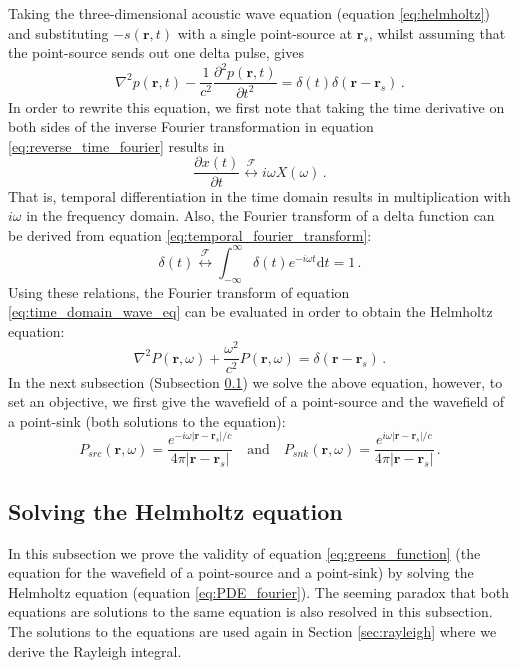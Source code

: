 Taking the three-dimensional acoustic wave equation (equation \ref{eq:helmholtz}) and substituting $-s(\mathbf r, t)$ with a single point-source at $\mathbf r_s$, whilst assuming that the point-source sends out one delta pulse, gives
\begin{equation}
    \nabla^2 p (\mathbf r, t) - \frac{1}{c^2} \frac{\partial^2 p (\mathbf r, t)}{\partial t^2} = \delta(t) \delta(\mathbf r-\mathbf r_s) \,.\label{eq:time_domain_wave_eq}
\end{equation}
In order to rewrite this equation, we first note that taking the time derivative on both sides of the inverse Fourier transformation in equation \ref{eq:reverse_time_fourier} results in
\begin{equation}
    \frac{\partial x(t)}{\partial t} \stackrel{\mathcal F}{\longleftrightarrow} i \omega X(\omega) \,. \nonumber
\end{equation}
That is, temporal differentiation in the time domain results in multiplication with $i\omega$ in the frequency domain.
Also, the Fourier transform of a delta function can be derived from equation \ref{eq:temporal_fourier_transform}:
\begin{equation}
    \delta(t) \stackrel{\mathcal F}{\longleftrightarrow} \int_{-\infty}^{\infty} \delta(t) e^{-i\omega t} \mathrm d t = 1 \,. \nonumber
\end{equation}
Using these relations, the Fourier transform of equation \ref{eq:time_domain_wave_eq} can be evaluated in order to obtain the Helmholtz equation:
\begin{equation}
    \nabla^2 P (\mathbf r, \omega) + \frac{\omega^2}{c^2} P (\mathbf r, \omega) = \delta(\mathbf r - \mathbf r_s) \,.\label{eq:PDE_fourier}
\end{equation}
In the next subsection (Subsection \ref{solving_helmholtz}) we solve the above equation, however, to set an objective, we first give the wavefield of a point-source and the wavefield of a point-sink (both solutions to the equation):
\begin{equation}
    P_{src} (\mathbf r, \omega) = \frac{e^{-i \omega |\mathbf r - \mathbf r_s| / c}}{4 \pi |\mathbf r-\mathbf r_s|} \quad \textrm{and} \quad
    P_{snk} (\mathbf r, \omega) = \frac{e^{i \omega |\mathbf r - \mathbf r_s| / c}}{4 \pi |\mathbf r-\mathbf r_s|} \,. \label{eq:greens_function}
\end{equation}

\subsection{Solving the Helmholtz equation}
\label{solving_helmholtz}
In this subsection we prove the validity of equation \ref{eq:greens_function} (the equation for the wavefield of a point-source and a point-sink) by solving the Helmholtz equation (equation \ref{eq:PDE_fourier}).
The seeming paradox that both equations are solutions to the same equation is also resolved in this subsection.
The solutions to the equations are used again in Section \ref{sec:rayleigh} where we derive the Rayleigh integral.

